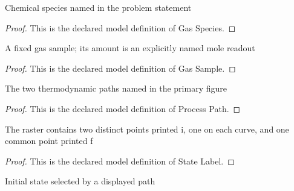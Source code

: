 \begin{definition}
  \label{def:physics:phyx-mini-0410:phyxminiproblems-problemphyxmini0410-gasspecies}
  Chemical species named in the problem statement
\end{definition}
\begin{proof}
  This is the declared model definition of Gas Species.
\end{proof}
\begin{definition}
  \label{def:physics:phyx-mini-0410:phyxminiproblems-problemphyxmini0410-gassample}
  A fixed gas sample; its amount is an explicitly named mole readout
\end{definition}
\begin{proof}
  This is the declared model definition of Gas Sample.
\end{proof}
\begin{definition}
  \label{def:physics:phyx-mini-0410:phyxminiproblems-problemphyxmini0410-processpath}
  The two thermodynamic paths named in the primary figure
\end{definition}
\begin{proof}
  This is the declared model definition of Process Path.
\end{proof}
\begin{definition}
  \label{def:physics:phyx-mini-0410:phyxminiproblems-problemphyxmini0410-statelabel}
  The raster contains two distinct points printed i, one on each curve, and one common point printed f
\end{definition}
\begin{proof}
  This is the declared model definition of State Label.
\end{proof}
\begin{definition}
  \label{def:physics:phyx-mini-0410:phyxminiproblems-problemphyxmini0410-processpath-initialstate}
  Initial state selected by a displayed path
\end{definition}
